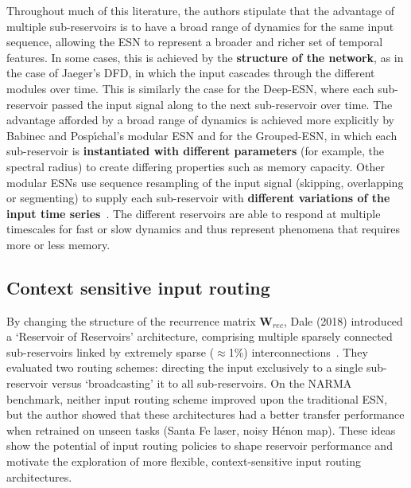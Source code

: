 Throughout much of this literature, the authors stipulate that the advantage of multiple sub-reservoirs is to have a broad range of dynamics for the same input sequence, allowing the ESN to represent a broader and richer set of temporal features. In some cases, this is achieved by the \textbf{structure of the network}, as in the case of Jaeger's DFD, in which the input cascades through the different modules over time. This is similarly the case for the Deep-ESN, where each sub-reservoir passed the input signal along to the next sub-reservoir over time. The advantage afforded by a broad range of dynamics is achieved more explicitly by Babinec and Posp\'{\i}chal's modular ESN and for the Grouped-ESN, in which each sub-reservoir is \textbf{instantiated with different parameters} (for example, the spectral radius) to create differing properties such as memory capacity. Other modular ESNs use sequence resampling of the input signal (skipping, overlapping or segmenting) to supply each sub-reservoir with \textbf{different variations of the input time series}~\cite{li_tanaka_2021}. The different reservoirs are able to respond at multiple timescales for fast or slow dynamics and thus represent phenomena that requires more or less memory.





\subsection{Context sensitive input routing}

By changing the structure of the recurrence matrix $\mathbf{W}_{rec}$, Dale (2018) introduced a `Reservoir of Reservoirs' architecture, comprising multiple sparsely connected sub-reservoirs linked by extremely sparse ($\approx$1\%) interconnections~\cite{dale_2018}. They evaluated two routing schemes: directing the input exclusively to a single sub-reservoir versus `broadcasting' it to all sub-reservoirs. On the NARMA benchmark, neither input routing scheme improved upon the traditional ESN, but the author showed that these architectures had a better transfer performance when retrained on unseen tasks (Santa Fe laser, noisy Hénon map). These ideas show the potential of input routing policies to shape reservoir performance and motivate the exploration of more flexible, context-sensitive input routing architectures.

